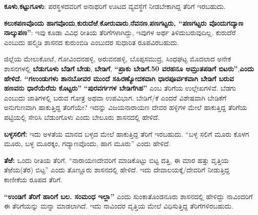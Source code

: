 \textbf{ಕೂಳು},\textbf{ಕಟ್ಟುಗೂಳು}: ಪರಸ್ಥಳದವರಿಗೆ ಅನಾಥರಿಗೆ ಊಟದ ವ್ಯವಸ್ಥೆಗೆ ನೀಡಬೇಕಾಗಿದ್ದ ತೆರಿಗೆ ಇರಬಹುದು.

\textbf{ಕಲುಕಪಣವೊಂದು ಹಾಗವೊಂದು},\textbf{ಕುರುದೆಱೆ},\textbf{ಕೋರುವಾರು},\textbf{ನೆವನಣ},\textbf{ಪಣಗಟ್ಟರು, “ಪಣಗಟ್ಟರು ವೊಂದುಗದ್ಯಾಣ ನಾಲ್ಕುಪಣ”}: ಇವು ಕೂಡಾ ವಿವಿಧ ರೀತಿಯ ತೆರಿಗೆಗಳಾಗಿದ್ದು, ಇವುಗಳ ಅರ್ಥ ತಿಳಿದುಬರುವುದಿಲ್ಲ. ಕುರುದೆರೆ ಎಂಬುದು ಹಲ್ಮಿಡಿ ಶಾಸನದ ಕುರುಂಬಿಡಿ ಎಂಬುದರ ಸುಧಾರಿತ ರೂಪವಿರಬಹುದು.

ಜಿಲ್ಲೆಯ ಮೇಲುಕೋಟೆ, ಗೋವಿಂದನಹಳ್ಳಿ, ಅರುವನಹಳ್ಳಿ, ಬೊಪ್ಪಸಮುದ್ರ, ಸಿಂಧಘಟ್ಟ ಮೊದಲಾದ ಅನೇಕ ಶಾಸನಗಳಲ್ಲಿ \textbf{ಬೆಡುಗೂಳು}\textbf{ ಬೆಡಿಗೆ}\textbf{ ಬೇಡು},\textbf{ ಬೇಡಿಗೆ},\textbf{ “ಪ್ರಾಕು ಬೇಡಿಗೆ.50 ವರಹನೂ ಅಮ್ರುತಪಡಿಗೆ ಬಿಟರು”},\break \textbf{ಎಂದು ಹೇಳಿದೆ. “ಗಉಂಡುಗಳು ಶಾನಬೋವರ ಮುಂದೆ ಸಹಿರಣ್ಯೋದಕವಾಗಿ ಧಾರಪೂರ್ವಕವಾಗಿ ಬೇಡಿಗೆ ಬರುವ ಹಣವನು ಧಾರೆಯೆರೆದು ಕೊಟ್ಟರು”}\textbf{ “ಪುರವರ್ಗಗಳ ಬೇಡಿಗೆಗಿಹ”} ಎಂಬ ತೆರಿಗೆಯ ಉಲ್ಲೇಖಗಳಿವೆ. ಬೆಡಗು ಎಂಬುದು ಜಾತಿಗಳಲ್ಲಿ ಬರುವ ಗೋತ್ರ ಅಥವಾ ಉಪವಿಭಾಗ. ಬೇಡಿಗೆ/ಕೆ ಎಂದರೆ ವಿಶೇಷವಾಗಿ ಬೇಡಿಕೆಗೆ ಅನುಗುಣವಾಗಿ ಹಾಕುತ್ತಿದ್ದ ತೆರಿಗೆಯೇ? ಇದನ್ನು ವಿಜಯನಾರಾಯಣ ದೇವರ ಹಳ್ಳಿಗಳ ಮೇಲೆ ಹಾಕುತ್ತಿದ್ದ ತೆರಿಗೆಯ ಪಟ್ಟಿಯಲ್ಲಿ ಸೇರಿಸಿ ಬೆಡುಂಗೊಳು ಎಂದು ಬೇಲೂರು ಶಾಸನದಲ್ಲಿ ಹೇಳಿದೆ.

\textbf{ಬಳ್ಳಸಲಿಗೆ:} ಇದು ಅಳತೆಯ ಮಾನದ ಬಳ್ಳದ ಮೇಲೆ ಹಾಕುತ್ತಿದ್ದ ತೆರಿಗೆ ಇರಬಹುದು. “ಬಳ್ಳ ಸಲಿಗೆ ಮೂರು ಕೊಳಗ ಮೂರು, ಬಳ್ಳ ಮೂರಕ್ಕಂ, ಗದ್ಯಾಣವೊಂದು, ಹಾಗ ಮೂರು” ಎಂದು ಹೇಳಿದೆ.

\textbf{ತೆಱೆ: } ಒಂದು ರೀತಿಯ ತೆರಿಗೆ. “ನಾರಾಯಣದೇವರಿಗೆ ಮಾಡಿಕೊಟ್ಟು ಬಿಟ್ಟ ದತ್ತಿ, ಈ ಮಾರ ಹತ್ತು ವೃತ್ತಿಯ ತೆಱೆಯ(ತೆರ) ಬಿಟ್ಟ” ಎಂದು ತೊಣ್ಣೂರು ಶಾಸನದಲ್ಲಿ ಹೇಳಿದೆ. ಇದು ದೇವಾಲಯಕ್ಕೆ/ದೇವರಿಗೆ ನೀಡುತ್ತಿದ್ದ ಕಾಣೀಕೆಯ ರೂಪದ ತೆರಿಗೆ.

\textbf{“ಉಂಡಿಗೆ ತೆರಿಗೆ ಹಾರಿಗೆ ಬಲ. ಸಂಮಂಧ ಇಲ್ಲಾ”} ಎಂದು ಸುಂಕಾತೊಂಡನೂರು ಶಾಸನದಲ್ಲಿ ಹೇಳಿದ್ದು ನಾವಿಂದರಿಗೆ ಈ ತೆರಿಗೆಯನ್ನು ಮನ್ನಾ ಮಾಡಲಾಗಿದೆ. ಇದು ನಾವಿಂದರ ವೃತ್ತಿಯ ಮೇಲೆ ವಿಧಿಸುತ್ತಿದ್ದ ತೆರಿಗೆಗಳಿರಬಹುದು.

